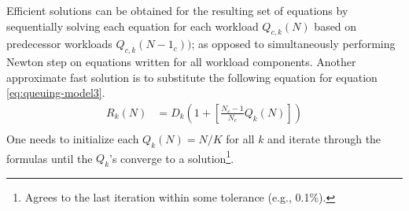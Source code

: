    Efficient solutions can be obtained for the resulting set of equations by sequentially solving each equation for each workload $Q_{c,k}(N)$ based on predecessor workloads $Q_{c,k}(N-1_c))$; as opposed to simultaneously performing Newton step on equations written for all workload components. Another approximate fast solution is to substitute the following equation for equation \ref{eq:queuing-model3}. 
   \begin{equation}\label{eq:queue-length-rt}\begin{split}  
       R_{k}(N) &= D_{k}\left(1+\left[\frac{N_c-1}{N_c}Q_{k}(N)\right]\right)   \\
  \end{split}\end{equation} 
  One needs to initialize each $Q_{k}(N)=N/K$ for all $k$ and iterate through the formulas until the $Q_k$'s converge to a solution\footnote{Agrees to the last iteration within some tolerance (e.g., 0.1\%). }.  

%
%
 
